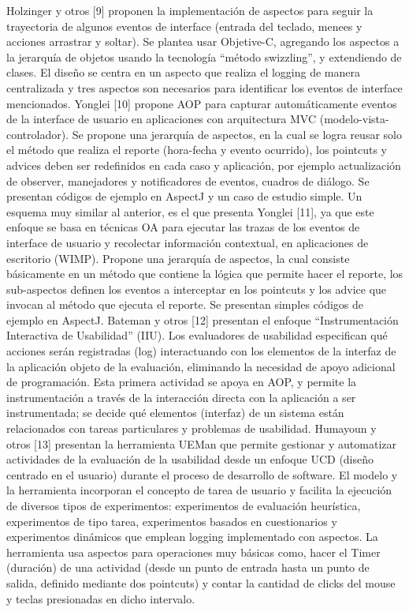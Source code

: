 Holzinger y otros [9] proponen la implementación de aspectos para seguir la trayectoria de algunos eventos de interface (entrada del teclado, menees y acciones arrastrar y soltar). Se plantea usar Objetive-C, agregando los aspectos a la jerarquía de objetos usando la tecnología “método swizzling”, y extendiendo de clases. El diseño se centra en un aspecto que realiza el logging de manera centralizada y tres aspectos son necesarios para identificar los eventos de interface mencionados. 
Yonglei [10] propone AOP para capturar automáticamente eventos de la interface de usuario en aplicaciones con arquitectura MVC (modelo-vista-controlador). Se propone una jerarquía de aspectos, en la cual se logra reusar solo el método que realiza el reporte (hora-fecha y evento ocurrido), los pointcuts y advices deben ser redefinidos en cada caso y aplicación, por ejemplo actualización de observer, manejadores y notificadores de eventos, cuadros de diálogo. Se presentan códigos de ejemplo en AspectJ y un caso de estudio simple.  
Un esquema muy similar al anterior, es el que presenta Yonglei [11], ya que este enfoque se basa en técnicas OA para ejecutar las trazas de los eventos de interface de usuario y recolectar información contextual, en aplicaciones de escritorio (WIMP). Propone una jerarquía de aspectos, la cual consiste básicamente en un método  que contiene la lógica que permite hacer el reporte, los sub-aspectos definen los eventos a interceptar en los pointcuts y los advice que invocan al método que ejecuta el reporte. Se presentan simples códigos de ejemplo en AspectJ.
Bateman y otros [12] presentan el enfoque “Instrumentación Interactiva de Usabilidad” (IIU). Los evaluadores de usabilidad especifican qué acciones serán registradas (log) interactuando con los elementos de la interfaz de la aplicación objeto de la evaluación, eliminando la necesidad de apoyo adicional de programación. Esta primera actividad se apoya en AOP, y permite la instrumentación a través de la interacción directa con la aplicación a ser instrumentada; se decide qué elementos (interfaz) de un sistema están relacionados con tareas particulares y problemas de usabilidad. 
Humayoun y otros [13] presentan la herramienta UEMan que permite gestionar y automatizar actividades de la evaluación de la usabilidad desde un enfoque UCD (diseño centrado en el usuario) durante el proceso de desarrollo de software. El modelo y la herramienta incorporan el concepto de tarea de usuario y facilita la ejecución de diversos tipos de experimentos: experimentos de evaluación heurística, experimentos de tipo tarea, experimentos basados en cuestionarios y experimentos dinámicos que emplean logging implementado con aspectos. La herramienta usa aspectos para operaciones muy básicas como, hacer el Timer (duración) de una actividad (desde un punto de entrada hasta un punto de salida, definido mediante dos pointcuts) y contar la cantidad de clicks del mouse y teclas presionadas en dicho intervalo.
